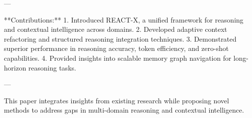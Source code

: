 ---

**Contributions:**  
1. Introduced REACT-X, a unified framework for reasoning and contextual intelligence across domains.  
2. Developed adaptive context refactoring and structured reasoning integration techniques.  
3. Demonstrated superior performance in reasoning accuracy, token efficiency, and zero-shot capabilities.  
4. Provided insights into scalable memory graph navigation for long-horizon reasoning tasks.  

---  

This paper integrates insights from existing research while proposing novel methods to address gaps in multi-domain reasoning and contextual intelligence.